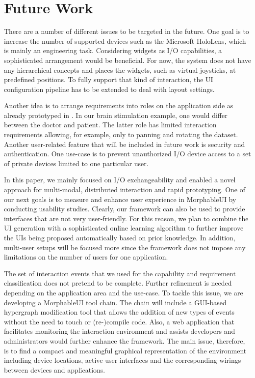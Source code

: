 \documentclass[twoside,twocolumn,10pt]{article}
\begin{document}
\section{Future Work} \label{future}


%
%
There are a number of different issues to be targeted in the future. One goal is to increase the number of supported devices such as the Microsoft HoloLens, which is mainly an engineering task. Considering widgets as I/O capabilities, a sophisticated arrangement would be beneficial. For now, the system does not have any hierarchical concepts and places the widgets, such as virtual joysticks, at predefined positions. To fully support that kind of interaction, the UI configuration pipeline has to be extended to deal with layout settings.


Another idea is to arrange requirements into roles on the application side as already prototyped in . In our brain stimulation example, one would differ between the doctor and patient. The latter role has limited interaction requirements allowing, for example, only to panning and rotating the dataset. Another user-related feature that will be included in future work is security and authentication. One use-case is to prevent unauthorized I/O device access to a set of private devices limited to one particular user.



%
%
In this paper, we mainly focused on I/O exchangeability and enabled a novel approach for multi-modal, distributed interaction and rapid prototyping.
One of our next goals is to measure and enhance user experience in MorphableUI by conducting usability studies. Clearly, our framework can also be used to provide interfaces that are not very user-friendly. For this reason, we plan to combine the UI generation with a sophisticated online learning algorithm to further improve the UIs being proposed automatically based on prior knowledge.
In addition, multi-user setups will be focused more since the framework does not impose any limitations on the number of users for one application.



%
%
The set of interaction events that we used for the capability and requirement classification does not pretend to be complete.
Further refinement is needed depending on the application area and the use-case.
To tackle this issue, we are developing a MorphableUI tool chain. The chain will include a GUI-based hypergraph modification tool that allows the addition of new types of events without the need to touch or (re-)compile code.
Also, a web application that facilitates monitoring the interaction environment and assists developers and administrators would further enhance the framework.
The main issue, therefore, is to find a compact and meaningful graphical representation of the environment including device locations, active user interfaces and the corresponding wirings between devices and applications.
\end{document}
